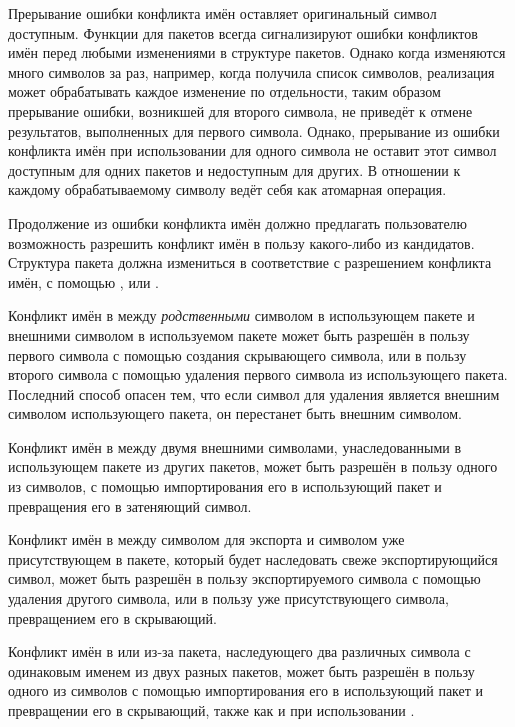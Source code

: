 Прерывание ошибки конфликта имён оставляет оригинальный символ доступным.
Функции для пакетов всегда сигнализируют ошибки конфликтов имён перед любыми
изменениями в структуре пакетов. Однако когда изменяются много символов за раз,
например, когда  получила список символов, реализация может
обрабатывать каждое изменение по отдельности, таким образом прерывание ошибки,
возникшей для второго символа, не приведёт к отмене результатов, выполненных для
первого символа. Однако, прерывание из ошибки конфликта имён при использовании
 для одного символа не оставит этот символ доступным для одних
пакетов и недоступным для других. В отношении к каждому обрабатываемому символу
 ведёт себя как атомарная операция.

Продолжение из ошибки конфликта имён должно предлагать пользователю возможность
разрешить конфликт имён в пользу какого-либо из кандидатов. Структура пакета
должна измениться в соответствие с разрешением конфликта имён, с помощью
,  или .

Конфликт имён в  между \emph{родственными} символом в
использующем пакете и внешними символом в используемом пакете может
быть разрешён в пользу первого символа с помощью создания скрывающего
символа, или в пользу второго символа с помощью удаления первого
символа из использующего пакета. Последний способ опасен тем, что если
символ для удаления является внешним символом использующего пакета, он
перестанет быть внешним символом.

Конфликт имён в  между двумя внешними символами,
унаследованными в использующем пакете из других пакетов, может быть
разрешён в пользу одного из символов, с помощью импортирования его в
использующий пакет и превращения его в затеняющий символ.

Конфликт имён в  между символом для экспорта и символом уже
присутствующем в пакете, который будет наследовать свеже экспортирующийся
символ, может быть разрешён в пользу экспортируемого символа с помощью
удаления другого символа, или в пользу уже присутствующего символа,
превращением его в скрывающий.

Конфликт имён в  или  из-за пакета,
наследующего два различных символа с одинаковым именем из двух разных
пакетов, может быть разрешён в пользу одного из символов с помощью
импортирования его в использующий пакет и превращении его в
скрывающий, также как и при использовании .

